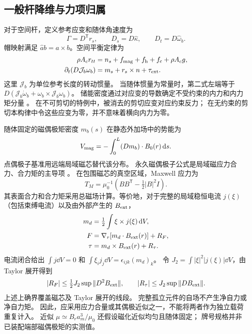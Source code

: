 \subsection{一般杆降维与力项归属}
\label{sm:general}
对于空间杆，定义参考应变和随体角速度为
\begin{equation}
 \Gamma=D^{\mathsf T}r_s,\qquad
 D_s=D\widehat\kappa,\qquad
 D_t=D\widehat\omega_b.
 \label{sm:rod-kinematics}
\end{equation}
帽映射满足 $\widehat a b=a\times b$。空间平衡定律为
\begin{align}
 \rho A_c r_{tt}&=n_s+f_{\rm mag}+f_{\rm h}+f_{\rm c}+\rho A_c g,\\
 \partial_t(D\mathcal J_b\omega_b)&=m_s+r_s\times n+\tau_{\rm ext}.
 \label{sm:rod-balances}
\end{align}
这里 $\mathcal J_b$ 为单位参考长度的转动惯量。
当随体惯量为常量时，第二式左端等于
$D(\mathcal J_b\dot\omega_b+\omega_b\times\mathcal J_b\omega_b)$。
储能密度通过对应变的导数确定不受约束的内力和内力矩分量 \citep{simo,antman}。
在不可剪切的特例中，被消去的剪切应变对应约束反力；
在无约束的剪切本构律中令这些应变为零，并不意味着横向内力为零。

随体固定的磁偶极矩密度 $m_b(s)$ 在静态外加场中的势能为
\begin{equation}
 V_{\rm mag}=-\int_0^L (Dm_b)\cdot B_0(r)\,\mathrm d s.
 \label{sm:distributed-magnetism}
\end{equation}
点偶极子基准用远端局域磁芯替代该分布。
永久磁偶极子公式是局域磁应力合力、合力矩的主导项 \citep{abbott}。
在包围磁芯的真空区域，Maxwell 应力为
\begin{equation}
 T_M=\mu_0^{-1}\left(BB^{\mathsf T}-\tfrac12|B|^2I\right).
 \label{sm:maxwell-stress}
\end{equation}
其表面合力和合力矩采用总磁场计算。等价地，对于完整的局域稳恒电流
$j(\xi)$（包括束缚电流）以及由外部产生的 $B_{\rm ext}$，
\begin{align}
 m_d&=\tfrac12\int \xi\times j(\xi)\,\mathrm d V,\nonumber\\
 F&=\nabla_r[m_d\cdot B_{\rm ext}(r)]+R_F,\nonumber\\
 \tau&=m_d\times B_{\rm ext}(r)+R_\tau.
 \label{sm:dipole-expansion}
\end{align}
电流闭合给出 $\int j\dd V=0$ 和
$\int\xi_i j_j\dd V=\epsilon_{ijk}(m_d)_k$。
令 $J_2=\int|\xi|^2|j(\xi)|\dd V$，由 Taylor 展开得到
\begin{equation}
 |R_F|\le\tfrac12J_2\sup\|D^2B_{\rm ext}\|,\qquad
 |R_\tau|\le J_2\sup\|DB_{\rm ext}\|.
 \label{sm:dipole-remainders}
\end{equation}
上述上确界覆盖磁芯及 Taylor 展开的线段。
完整孤立元件的自场不产生净自力或净自力矩。
因此，应采用应力合量或其偶极近似之一，不能将两者作为独立载荷重复计入。
近似 $\mu\simeq B_ra_m^3/\mu_0$ 还假设磁化近似均匀且随体固定；
牌号规格并非已装配端部磁偶极矩的实测值。

